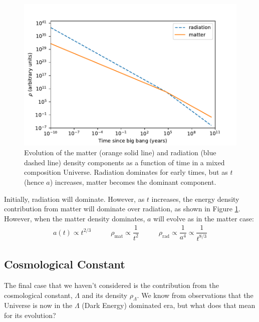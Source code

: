 \documentclass[11pt,a4paper,notoc]{tufte-handout}
\begin{document}
\begin{figure}
\includegraphics[width=1\linewidth]{Images/density_plot} \caption{Evolution of the matter (orange solid line) and radiation (blue dashed line) density components as a function of time in a mixed composition Universe. Radiation dominates for early times, but as $t$ (hence $a$) increases, matter becomes the dominant component.}\label{fig:density-fig}
\end{figure}

Initially, radiation will dominate. However, as \(t\) increases, the
energy density contribution from matter will dominate over radiation, as
shown in
Figure \ref{fig:density-fig}. However, when the matter density
dominates, \(a\) will evolve as in the matter case:
\begin{equation}
\begin{array}{lcr}
    a(t) \propto t^{2/3} & \qquad
    \rho_{\text{mat}} \propto \dfrac{1}{t^2} & \qquad
    \rho_{\text{rad}} \propto \dfrac{1}{a^4} \propto \dfrac{1}{t^{8/3}}
\end{array}
\label{eq:a-rho-comb}
\end{equation}

\hypertarget{sec:dark_energy_1}{%
\subsection{Cosmological Constant}\label{sec:dark_energy_1}}

The final case that we haven't considered is the contribution from the
cosmological constant, \(\Lambda\) and its density \(\rho_{\Lambda}\). We
know from observations that the Universe is now in the \(\Lambda\) (Dark
Energy) dominated era, but what does that mean for its evolution?
\end{document}
